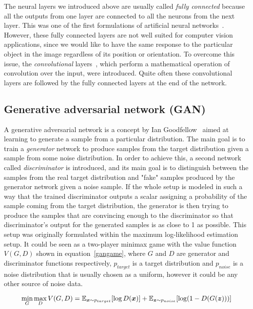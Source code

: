 The neural layers we introduced above are usually called {\em fully connected} because all the outputs from one layer are connected to all the neurons from the next layer. This was one of the first formulations of artificial neural networks~\cite{orignet}. However, these fully connected layers are not well suited for computer vision applications, since we would like to have the same response to the particular object in the image regardless of its position or orientation. To overcome this issue, the {\em convolutional} layers~\cite{convnet}, which perform a mathematical operation of convolution over the input, were introduced. Quite often these convolutional layers are followed by the fully connected layers at the end of the network.

\subsection{Generative adversarial network (GAN)}

A generative adversarial network is a concept by Ian Goodfellow~\cite{origgan} aimed at learning to generate a sample from a particular distribution. The main goal is to train a {\em generator} network to produce samples from the target distribution given a sample from some noise distribution. In order to achieve this, a second network called {\em discriminator} is introduced, and its main goal is to distinguish between the samples from the real target distribution and "fake" samples produced by the generator network given a noise sample. If the whole setup is modeled in such a way that the trained discriminator outputs a scalar assigning a probability of the sample coming from the target distribution, the generator is then trying to produce the samples that are convincing enough to the discriminator so that discriminator's output for the generated samples is as close to 1 as possible. This setup was originally formulated within the maximum log-likelihood estimation setup. It could be seen as a two-player minimax game with the value function $V(G, D)$ shown in equation~\ref{gangame}, where $G$ and $D$ are generator and discriminator functions respectively, $p_{target}$ is a target distribution and $p_{noise}$ is a noise distribution that is usually chosen as a uniform, however it could be any other source of noise data.

\begin{equation}
\min_G \max_D V(G, D) = \operatorname{\mathbb{E}}_{\bm{x}\sim p_{target}}[\log D(\bm{x})] + \operatorname{\mathbb{E}}_{\bm{z}\sim p_{noise}} [\log(1 - D(G(\bm{z})))]
\label{gangame}
\end{equation}

